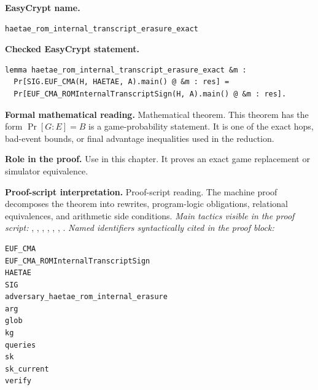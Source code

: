 \begin{formaltheorem}
\noindent\textbf{EasyCrypt name.}
\begin{lstlisting}[language=EasyCrypt,basicstyle=\ttfamily\scriptsize]
haetae_rom_internal_transcript_erasure_exact
\end{lstlisting}
\noindent\textbf{Checked EasyCrypt statement.}
\begin{lstlisting}[language=EasyCrypt,basicstyle=\ttfamily\scriptsize]
lemma haetae_rom_internal_transcript_erasure_exact &m :
  Pr[SIG.EUF_CMA(H, HAETAE, A).main() @ &m : res] =
  Pr[EUF_CMA_ROMInternalTranscriptSign(H, A).main() @ &m : res].
\end{lstlisting}
\noindent\textbf{Formal mathematical reading.}
Mathematical theorem. This theorem has the form \(\Pr[G:E] = B\) is a game-probability statement.  It is one of the exact hops, bad-event bounds, or final advantage inequalities used in the reduction.

\noindent\textbf{Role in the proof.}
Use in this chapter. It proves an exact game replacement or simulator equivalence.

\noindent\textbf{Proof-script interpretation.}
Proof-script reading. The machine proof decomposes the theorem into rewrites, program-logic obligations, relational equivalences, and arithmetic side conditions.
\emph{Main tactics visible in the proof script:} , , , , , , .
\emph{Named identifiers syntactically cited in the proof block:}
\begin{lstlisting}[language=EasyCrypt,basicstyle=\ttfamily\scriptsize]
EUF_CMA
EUF_CMA_ROMInternalTranscriptSign
HAETAE
SIG
adversary_haetae_rom_internal_erasure
arg
glob
kg
queries
sk
sk_current
verify
\end{lstlisting}

\end{formaltheorem}


